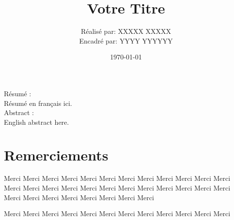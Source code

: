 \documentclass[12pt,a4paper]{report}
\title{Votre Titre}
\author{Réalisé par: XXXXX XXXXX\\Encadré par: YYYY YYYYYY}
\date{\today}
\begin{document}
\maketitle
\thispagestyle{empty}


		Résumé : \\
		Résumé en français ici.\\
		
	    
    	Abstract : \\
		English abstract here.
		


\chapter*{Remerciements} %

Merci Merci Merci Merci Merci Merci Merci Merci Merci Merci Merci Merci Merci Merci Merci Merci Merci Merci Merci Merci Merci Merci Merci Merci Merci Merci Merci Merci Merci Merci Merci Merci \par
Merci Merci Merci Merci Merci Merci Merci Merci Merci Merci Merci Merci \par
\newpage

\tableofcontents\clearpage %
\listoffigures\clearpage %
\listoftables\clearpage %
\printglossaries\clearpage %
\setcounter{page}{0} %







\appendix


\end{document}
